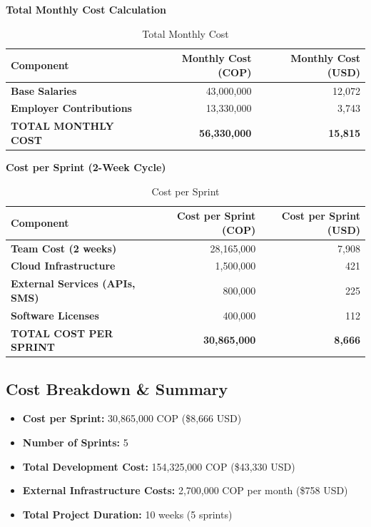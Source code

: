 \documentclass[12pt,a4paper]{article}
\begin{document}
\textbf{Total Monthly Cost Calculation}

\begin{table}[h]
\centering
\caption{Total Monthly Cost}
\label{tab:monthly}
\begin{tabular}{|l|r|r|}
\hline
\textbf{Component} & \textbf{Monthly Cost (COP)} & \textbf{Monthly Cost (USD)} \\
\hline
\textbf{Base Salaries} & 43,000,000 & 12,072 \\
\textbf{Employer Contributions} & 13,330,000 & 3,743 \\
\textbf{TOTAL MONTHLY COST} & \textbf{56,330,000} & \textbf{15,815} \\
\hline
\end{tabular}
\end{table}

\textbf{Cost per Sprint (2-Week Cycle)}

\begin{table}[h]
\centering
\caption{Cost per Sprint}
\label{tab:sprint}
\begin{tabular}{|l|r|r|}
\hline
\textbf{Component} & \textbf{Cost per Sprint (COP)} & \textbf{Cost per Sprint (USD)} \\
\hline
\textbf{Team Cost (2 weeks)} & 28,165,000 & 7,908 \\
\textbf{Cloud Infrastructure} & 1,500,000 & 421 \\
\textbf{External Services (APIs, SMS)} & 800,000 & 225 \\
\textbf{Software Licenses} & 400,000 & 112 \\
\textbf{TOTAL COST PER SPRINT} & \textbf{30,865,000} & \textbf{8,666} \\
\hline
\end{tabular}
\end{table}

\subsection{Cost Breakdown \& Summary}

\begin{itemize}
    \item \textbf{Cost per Sprint:} 30,865,000 COP (\$8,666 USD)
    \item \textbf{Number of Sprints:} 5
    \item \textbf{Total Development Cost:} 154,325,000 COP (\$43,330 USD)
    \item \textbf{External Infrastructure Costs:} 2,700,000 COP per month (\$758 USD)
    \item \textbf{Total Project Duration:} 10 weeks (5 sprints)
\end{itemize}
\end{document}
